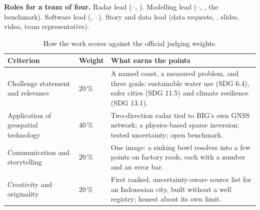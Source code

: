 \textbf{Roles for a team of four.} Radar lead (--, ). Modelling lead (--,
, the benchmark). Software lead (, --). Story and data lead (data requests,
, slides, video, team representative).

{\small
\begin{xltabular}{\linewidth}{@{}L{46mm}L{13mm}Y@{}}
\caption{How the work scores against the official judging weights.}\label{tab:agc}\\*
\toprule
\textbf{Criterion} & \textbf{Weight} & \textbf{What earns the points}\\*
\midrule
Challenge statement and relevance & 20\,\% & A named coast, a measured problem, and three goals:
  sustainable water use (SDG 6.4), safer cities (SDG 11.5) and climate resilience (SDG 13.1).\\
Application of geospatial technology & 40\,\% & Two-direction radar tied to BIG's own GNSS network; a
  physics-based sparse inversion; tested uncertainty; open benchmark.\\
Communication and storytelling & 20\,\% & One image: a sinking bowl resolves into a few points on
  factory roofs, each with a number and an error bar.\\
Creativity and originality & 20\,\% & First ranked, uncertainty-aware source list for an Indonesian
  city, built without a well registry; honest about its own limit.\\
\bottomrule
\end{xltabular}}
